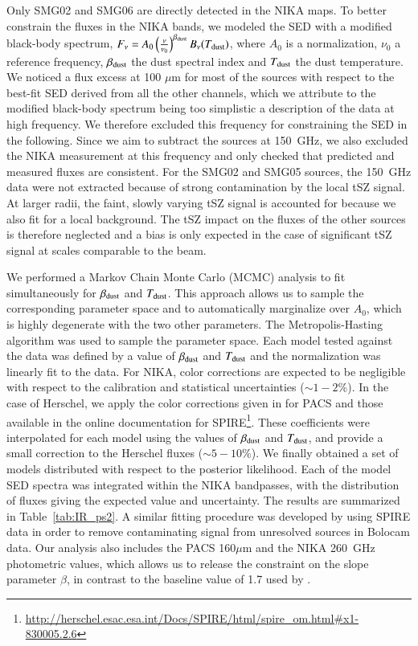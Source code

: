 \documentclass[twocolumn,traditabstract]{aa}
\begin{document}
Only SMG02 and SMG06 are directly detected in the NIKA maps. To better constrain the fluxes in the NIKA bands, we modeled the SED with a modified black-body spectrum, $F_{\nu} = A_0 \left(\frac{\nu}{\nu_0}\right)^{\beta_{\rm dust}} B_{\nu}(T_{\rm dust})$, where $A_0$ is a normalization, $\nu_0$ a reference frequency, $\beta_{\rm dust}$ the dust spectral index and $T_{\rm dust}$ the dust temperature. We noticed a flux excess at 100 $\mu$m for most of the sources with respect to the best-fit SED derived from all the other channels, which we attribute to the modified black-body spectrum being too simplistic a description of the data at high frequency. We therefore excluded this frequency for constraining the SED in the following. Since we aim to subtract the sources at 150~GHz, we also excluded the NIKA measurement at this frequency and only checked that predicted and measured fluxes are consistent. For the SMG02 and SMG05 sources, the 150~GHz data were not extracted because of strong contamination by the local tSZ signal. At larger radii, the faint, slowly varying tSZ signal is accounted for because we also fit for a local background. The tSZ impact on the fluxes of the other sources is therefore neglected and a bias is only expected in the case of significant tSZ signal at scales comparable to the beam.

We performed a Markov Chain Monte Carlo (MCMC) analysis to fit simultaneously for $\beta_{\rm dust}$ and $T_{\rm dust}$. This approach allows us to sample the corresponding parameter space and to automatically marginalize over $A_0$, which is highly degenerate with the two other parameters. The Metropolis-Hasting algorithm was used to sample the parameter space. Each model tested against the data was defined by a value of $\beta_{\rm dust}$ and $T_{\rm dust}$ and the normalization was linearly fit to the data. For NIKA, color corrections are expected to be negligible with respect to the calibration and statistical uncertainties ($\sim 1-2$\%). In the case of Herschel, we apply the color corrections given in \cite{poglitsch2010} for PACS and those available in the online documentation for SPIRE\footnote{\url{http://herschel.esac.esa.int/Docs/SPIRE/html/spire_om.html\#x1-830005.2.6}}. These coefficients were interpolated for each model using the values of $\beta_{\rm dust}$ and $T_{\rm dust}$, and provide a small correction to the Herschel fluxes ($\sim 5-10$\%). We finally obtained a set of models distributed with respect to the posterior likelihood. Each of the model SED spectra was integrated within the NIKA bandpasses, with the distribution of fluxes giving the expected value and uncertainty. The results are summarized in Table~\ref{tab:IR_ps2}. A similar fitting procedure was developed by \cite{sayers2013c} using SPIRE data in order to remove contaminating signal from unresolved sources in Bolocam data. Our analysis also includes the PACS 160$\mu$m and the NIKA 260~GHz photometric values, which allows us to release the constraint on the slope parameter $\beta$, in contrast to the baseline value of 1.7 used by \cite{sayers2013c}.
\end{document}
